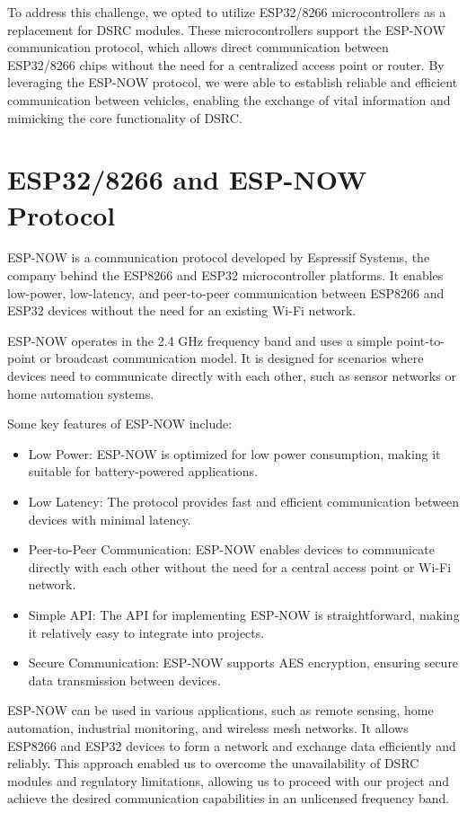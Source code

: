 \documentclass[
12pt,
oneside, 
onehalfspacing, 
nolistspacing, 
parskip, 
chapterinoneline, 
]{AASTCOMPUTER}
\begin{document}
To address this challenge, we opted to utilize ESP32/8266 microcontrollers as a replacement for DSRC modules. These microcontrollers support the ESP-NOW communication protocol, which allows direct communication between ESP32/8266 chips without the need for a centralized access point or router. By leveraging the ESP-NOW protocol, we were able to establish reliable and efficient communication between vehicles, enabling the exchange of vital information and mimicking the core functionality of DSRC.

\section{ESP32/8266 and ESP-NOW Protocol}
ESP-NOW is a communication protocol developed by Espressif Systems, the company behind the ESP8266 and ESP32 microcontroller platforms. It enables low-power, low-latency, and peer-to-peer communication between ESP8266 and ESP32 devices without the need for an existing Wi-Fi network.

ESP-NOW operates in the 2.4 GHz frequency band and uses a simple point-to-point or broadcast communication model. It is designed for scenarios where devices need to communicate directly with each other, such as sensor networks or home automation systems.

Some key features of ESP-NOW include:

\begin{itemize}
    \item Low Power: ESP-NOW is optimized for low power consumption, making it suitable for battery-powered applications.
    \item Low Latency: The protocol provides fast and efficient communication between devices with minimal latency.
    \item Peer-to-Peer Communication: ESP-NOW enables devices to communicate directly with each other without the need for a central access point or Wi-Fi network.
    \item Simple API: The API for implementing ESP-NOW is straightforward, making it relatively easy to integrate into projects.
    \item Secure Communication: ESP-NOW supports AES encryption, ensuring secure data transmission between devices.
\end{itemize}

ESP-NOW can be used in various applications, such as remote sensing, home automation, industrial monitoring, and wireless mesh networks. It allows ESP8266 and ESP32 devices to form a network and exchange data efficiently and reliably. This approach enabled us to overcome the unavailability of DSRC modules and regulatory limitations, allowing us to proceed with our project and achieve the desired communication capabilities in an unlicensed frequency band.
\end{document}
